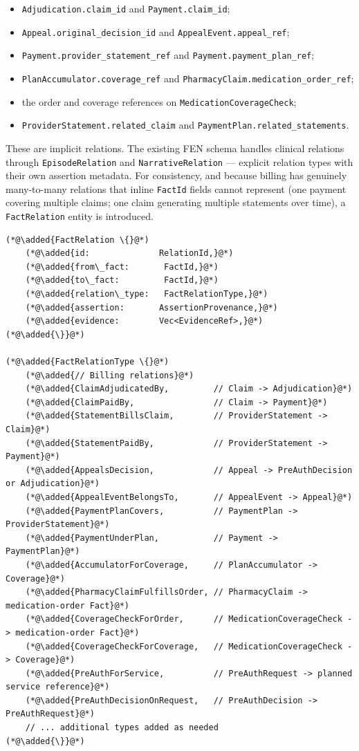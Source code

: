 \documentclass[11pt]{article}
\newcommand{\added}[1]{\textcolor{accentblue}{#1}}
\begin{document}
\begin{itemize}
\item \texttt{Adjudication.claim\_id} and \texttt{Payment.claim\_id};
\item \texttt{Appeal.original\_decision\_id} and \texttt{AppealEvent.appeal\_ref};
\item \texttt{Payment.provider\_statement\_ref} and \texttt{Payment.payment\_plan\_ref};
\item \texttt{PlanAccumulator.coverage\_ref} and \texttt{PharmacyClaim.medication\_order\_ref};
\item the order and coverage references on \texttt{MedicationCoverageCheck};
\item \texttt{ProviderStatement.related\_claim} and \texttt{PaymentPlan.related\_statements}.
\end{itemize}

These are implicit relations. The existing FEN schema handles
clinical relations through \texttt{EpisodeRelation} and
\texttt{NarrativeRelation} --- explicit relation types with their own
assertion metadata. For consistency, and because billing has genuinely
many-to-many relations that inline \texttt{FactId} fields cannot
represent (one payment covering multiple claims; one claim generating
multiple statements over time), a \texttt{FactRelation} entity is introduced.

\begin{lstlisting}
(*@\added{FactRelation \{}@*)
    (*@\added{id:              RelationId,}@*)
    (*@\added{from\_fact:       FactId,}@*)
    (*@\added{to\_fact:         FactId,}@*)
    (*@\added{relation\_type:   FactRelationType,}@*)
    (*@\added{assertion:       AssertionProvenance,}@*)
    (*@\added{evidence:        Vec<EvidenceRef>,}@*)
(*@\added{\}}@*)

(*@\added{FactRelationType \{}@*)
    (*@\added{// Billing relations}@*)
    (*@\added{ClaimAdjudicatedBy,         // Claim -> Adjudication}@*)
    (*@\added{ClaimPaidBy,                // Claim -> Payment}@*)
    (*@\added{StatementBillsClaim,        // ProviderStatement -> Claim}@*)
    (*@\added{StatementPaidBy,            // ProviderStatement -> Payment}@*)
    (*@\added{AppealsDecision,            // Appeal -> PreAuthDecision or Adjudication}@*)
    (*@\added{AppealEventBelongsTo,       // AppealEvent -> Appeal}@*)
    (*@\added{PaymentPlanCovers,          // PaymentPlan -> ProviderStatement}@*)
    (*@\added{PaymentUnderPlan,           // Payment -> PaymentPlan}@*)
    (*@\added{AccumulatorForCoverage,     // PlanAccumulator -> Coverage}@*)
    (*@\added{PharmacyClaimFulfillsOrder, // PharmacyClaim -> medication-order Fact}@*)
    (*@\added{CoverageCheckForOrder,      // MedicationCoverageCheck -> medication-order Fact}@*)
    (*@\added{CoverageCheckForCoverage,   // MedicationCoverageCheck -> Coverage}@*)
    (*@\added{PreAuthForService,          // PreAuthRequest -> planned service reference}@*)
    (*@\added{PreAuthDecisionOnRequest,   // PreAuthDecision -> PreAuthRequest}@*)
    // ... additional types added as needed
(*@\added{\}}@*)
\end{lstlisting}
\end{document}
